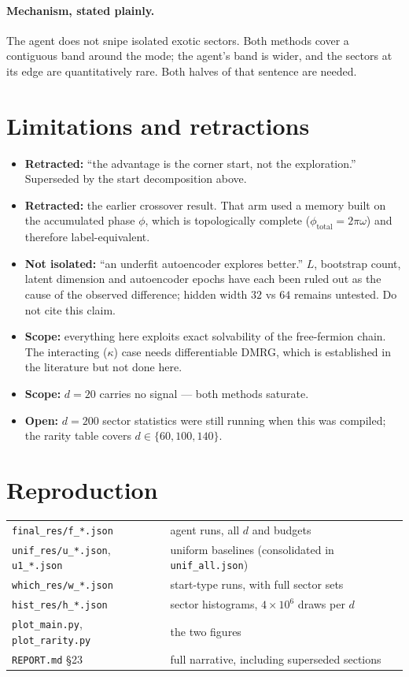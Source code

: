 \documentclass[11pt,a4paper]{article}
\begin{document}
\paragraph{Mechanism, stated plainly.} The agent does not snipe isolated exotic sectors. Both
methods cover a contiguous band around the mode; the agent's band is wider, and the sectors at
its edge are quantitatively rare. Both halves of that sentence are needed.

\section{Limitations and retractions}

\begin{itemize}\itemsep2pt
\item \textbf{Retracted:} ``the advantage is the corner start, not the exploration.''
Superseded by the start decomposition above.
\item \textbf{Retracted:} the earlier crossover result. That arm used a memory built on the
accumulated phase $\phi$, which is topologically complete ($\phi_{\text{total}}=2\pi\omega$)
and therefore label-equivalent.
\item \textbf{Not isolated:} ``an underfit autoencoder explores better.'' $L$, bootstrap count,
latent dimension and autoencoder epochs have each been ruled out as the cause of the observed
difference; hidden width $32$ vs $64$ remains untested. Do not cite this claim.
\item \textbf{Scope:} everything here exploits exact solvability of the free-fermion chain.
The interacting ($\kappa$) case needs differentiable DMRG, which is established in the
literature but not done here.
\item \textbf{Scope:} $d=20$ carries no signal --- both methods saturate.
\item \textbf{Open:} $d=200$ sector statistics were still running when this was compiled; the
rarity table covers $d\in\{60,100,140\}$.
\end{itemize}

\section{Reproduction}

\begin{tabular}{@{}ll@{}}
\toprule
\texttt{final\_res/f\_*.json} & agent runs, all $d$ and budgets\\
\texttt{unif\_res/u\_*.json}, \texttt{u1\_*.json} & uniform baselines (consolidated in \texttt{unif\_all.json})\\
\texttt{which\_res/w\_*.json} & start-type runs, with full sector sets\\
\texttt{hist\_res/h\_*.json} & sector histograms, $4\times10^6$ draws per $d$\\
\texttt{plot\_main.py}, \texttt{plot\_rarity.py} & the two figures\\
\texttt{REPORT.md} \S23 & full narrative, including superseded sections\\
\bottomrule
\end{tabular}
\end{document}
